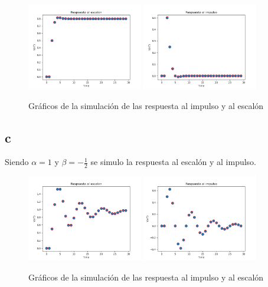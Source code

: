 \documentclass[../../ASSD_TP1_G7.tex]{subfiles}
\begin{document}
\begin{figure}[H]
\centering
{}
{\includegraphics[width=0.45\textwidth]{figures/b-escalon.png}}
{\includegraphics[width=0.45\textwidth]{figures/b-impulso.png}}
\caption{Gráficos de la simulación de las respuesta al impulso y al escalón}\label{f:ejb}
\end{figure}


\subsection*{c}
Siendo $\alpha = 1$ y $\beta = -\frac{1}{2}$ se simulo la respuesta al escalón y al impulso.


\begin{figure}[H]
\centering
{}
{\includegraphics[width=0.45\textwidth]{figures/c-escalon.png}}
{\includegraphics[width=0.45\textwidth]{figures/c-impulso.png}}
\caption{Gráficos de la simulación de las respuesta al impulso y al escalón}\label{f:ejc}
\end{figure}
\end{document}
